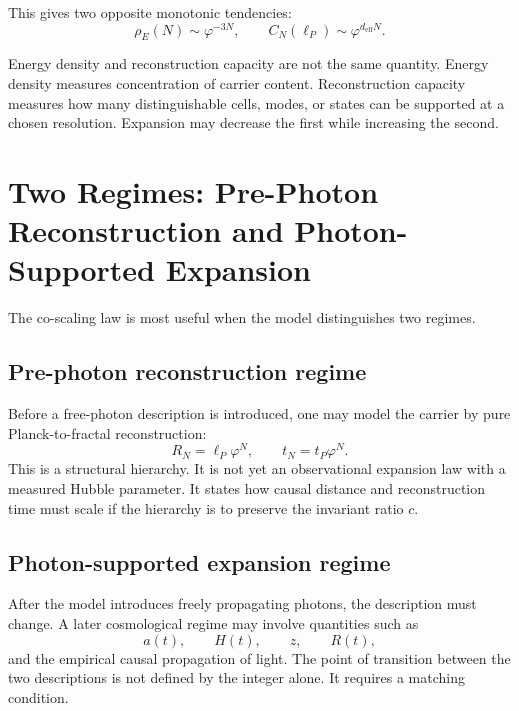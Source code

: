 \documentclass[11pt,a4paper]{article}
\newcommand{\lP}{\ell_{P}}
\newcommand{\tP}{t_{P}}
\newcommand{\ph}{\varphi}
\begin{document}
This gives two opposite monotonic tendencies:
\[
  \rho_E(N)\sim\ph^{-3N},
  \qquad
  C_N(\lP)\sim\ph^{d_{\mathrm{eff}}N}.
\]

\begin{noteBox}
Energy density and reconstruction capacity are not the same quantity.  Energy
density measures concentration of carrier content.  Reconstruction capacity measures
how many distinguishable cells, modes, or states can be supported at a chosen
resolution.  Expansion may decrease the first while increasing the second.
\end{noteBox}

\section{Two Regimes: Pre-Photon Reconstruction and Photon-Supported Expansion}

The co-scaling law is most useful when the model distinguishes two regimes.

\subsection{Pre-photon reconstruction regime}

Before a free-photon description is introduced, one may model the carrier by pure
Planck-to-fractal reconstruction:
\[
  R_N=\lP\ph^N,
  \qquad
  t_N=\tP\ph^N.
\]
This is a structural hierarchy.  It is not yet an observational expansion law with a
measured Hubble parameter.  It states how causal distance and reconstruction time
must scale if the hierarchy is to preserve the invariant ratio $c$.

\subsection{Photon-supported expansion regime}

After the model introduces freely propagating photons, the description must change.
A later cosmological regime may involve quantities such as
\[
  a(t),\qquad H(t),\qquad z,\qquad R(t),
\]
and the empirical causal propagation of light.  The point of transition between the
two descriptions is not defined by the integer alone.  It requires a matching
condition.

\end{document}
